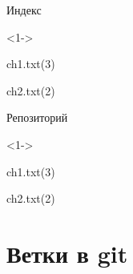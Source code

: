 \documentclass[9pt, aspectratio=1610]{beamer}
\begin{document}
\begin{frame}[fragile]
\begin{minipage}[t][\paperheight-3cm][t]{0.68\linewidth}
\begin{minipage}[t][3cm][t]{\linewidth}
\begin{minipage}[t]{0.29\linewidth}
\begin{exampleblock}{Индекс\strut}
					
					\begin{onlyenv}<1->
						\strut ch1.txt(3)
						
						\strut ch2.txt(2)
						
					\end{onlyenv}%
					
					
				\end{exampleblock}
			\end{minipage}\hfill%
			\begin{minipage}[t]{0.29\linewidth}
				\begin{exampleblock}{Репозиторий\strut}      %
					
					\begin{onlyenv}<1->
						\strut ch1.txt(3)
						
						\strut ch2.txt(2)%
					\end{onlyenv}
					
				\end{exampleblock}
			\end{minipage}\hfill%
		\end{minipage}		
		
	\end{minipage}
	
	
\end{frame}

\section{Ветки в git}

\begin{frame}
	\tableofcontents
	\sectionpage
\end{frame}
\end{document}
